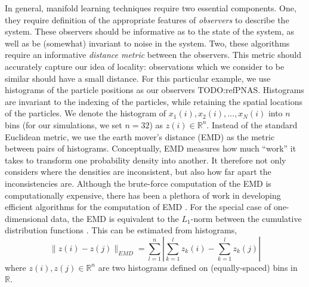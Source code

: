 \documentclass[prl, reprint, final, showkeys]{revtex4-1}
\begin{document}
In general, manifold learning techniques require two essential components.
%
One, they require definition of the appropriate features of {\em observers} to describe the system. 
%
These observers should be informative as to the state of the system, as well as be (somewhat) invariant to noise in the system. 
%
Two, these algorithms require an informative {\em distance metric} between the observers.
%
This metric should accurately capture our idea of locality: observations which we consider to be similar should have a small distance. 
%
For this particular example, we use histograms of the particle positions as our observers TODO:refPNAS. 
%
Histograms are invariant to the indexing of the particles, while retaining the spatial locations of the particles.
%
We denote the histogram of $x_1(i), x_2(i), \dots, x_N(i)$ into $n$ bins (for our simulations, we set $n=32$) as $z(i) \in \mathbb{R}^n$.
%
Instead of the standard Euclidean metric, we use the earth mover's distance (EMD) \cite{rubner2000earth} as the metric between pairs of histograms. 
%
Conceptually, EMD measures how much ``work'' it takes to transform one probability density into another.
%
It therefore not only considers where the densities are inconsistent, but also how far apart the inconsistencies are.
%
Although the brute-force computation of the EMD is computationally expensive, there has been a plethora of work in developing efficient algorithms for the computation of EMD \cite{Pele-eccv2008, Pele-iccv2009}.
%
%
For the special case of one-dimensional data, the EMD is equivalent to the $L_1$-norm between the cumulative distribution functions \cite{rubner2000perceptual}.
%
This can be estimated from histograms, 
\begin{equation}
\| z(i) - z(j) \|_{EMD} = \sum_{l=1}^{n} \left| \sum_{k=1}^l z_k(i) - \sum_{k=1}^l z_k(j) \right|
\end{equation}
where $z(i), z(j) \in \mathbb{R}^n$ are two histograms defined on (equally-spaced) bins in $\mathbb{R}$. 
\end{document}
